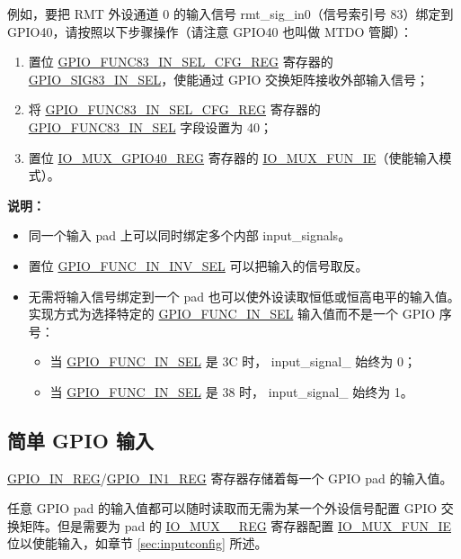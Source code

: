 \documentclass[main\_\_CN.tex]{subfiles}
\begin{document}
例如，要把 RMT 外设通道 0 的输入信号 rmt\_sig\_in0（信号索引号 83）绑定到 GPIO40，请按照以下步骤操作（请注意 GPIO40 也叫做 MTDO 管脚）：
\begin{enumerate}
\item 置位 \hyperref[regdesc:GPIOFUNCNINSELCFGREG]{GPIO\_FUNC83\_IN\_SEL\_CFG\_REG} 寄存器的 \hyperref[fielddesc:GPIOSIGNINSEL]{GPIO\_SIG83\_IN\_SEL}，使能通过 GPIO 交换矩阵接收外部输入信号；
\item 将 \hyperref[regdesc:GPIOFUNCNINSELCFGREG]{GPIO\_FUNC83\_IN\_SEL\_CFG\_REG} 寄存器的 \hyperref[fielddesc:GPIOFUNCNINSEL]{GPIO\_FUNC83\_IN\_SEL} 字段设置为 40；
\item 置位 \hyperref[regdesc:IOMUXnREG]{IO\_MUX\_GPIO40\_REG} 寄存器的 \hyperref[fielddesc:IOMUXFUNIE]{IO\_MUX\_FUN\_IE}（使能输入模式）。
\end{enumerate}

{\bfseries 说明：}
\begin{itemize}
\item 同一个输入 pad 上可以同时绑定多个内部 input\_signals。
\item 置位 \hyperref[fielddesc:GPIOFUNCNININVSEL]{GPIO\_FUNC\_IN\_INV\_SEL} 可以把输入的信号取反。
\item 无需将输入信号绑定到一个 pad 也可以使外设读取恒低或恒高电平的输入值。实现方式为选择特定的 \hyperref[fielddesc:GPIOFUNCNINSEL]{GPIO\_FUNC\_IN\_SEL} 输入值而不是一个 GPIO 序号：
\begin {itemize}
\item 当 \hyperref[fielddesc:GPIOFUNCNINSEL]{GPIO\_FUNC\_IN\_SEL} 是 \hexprefix{}3C 时， input\_signal\_ 始终为 0；
\item 当 \hyperref[fielddesc:GPIOFUNCNINSEL]{GPIO\_FUNC\_IN\_SEL} 是 \hexprefix{}38 时， input\_signal\_ 始终为 1。
\end {itemize}
\end{itemize}

\subsection{简单 GPIO 输入}\label{IOMUXSimpleGPIOInput}

\hyperref[regdesc:GPIOINREG]{GPIO\_IN\_REG}/\hyperref[regdesc:GPIOIN1REG]{GPIO\_IN1\_REG} 寄存器存储着每一个 GPIO pad 的输入值。

任意 GPIO pad 的输入值都可以随时读取而无需为某一个外设信号配置 GPIO 交换矩阵。但是需要为 pad  的 \hyperref[regdesc:IOMUXnREG]{IO\_MUX\_\_REG} 寄存器配置 \hyperref[fielddesc:IOMUXFUNIE]{IO\_MUX\_FUN\_IE} 位以使能输入，如章节 \ref{sec:inputconfig} 所述。
\end{document}

